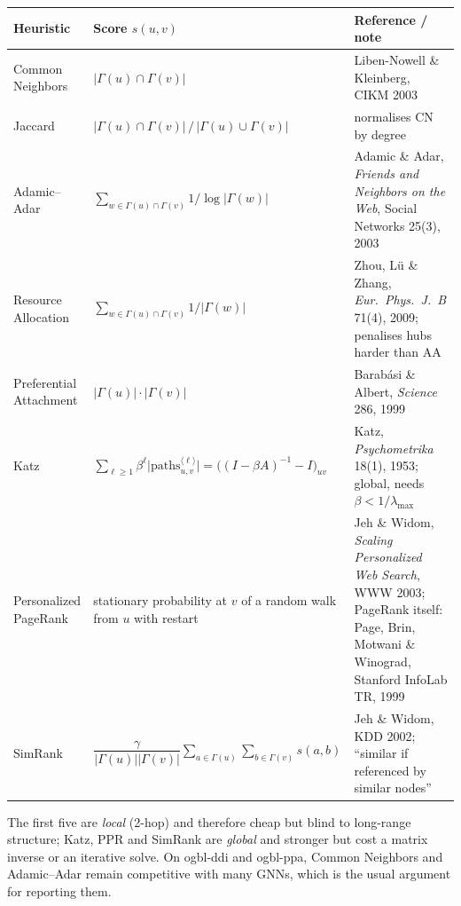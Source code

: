 \begin{center}
\footnotesize
\setlength{\tabcolsep}{4pt}
\renewcommand{\arraystretch}{1.35}
\begin{tabular}{@{}>{\raggedright\arraybackslash}p{2.35cm}
                  >{\raggedright\arraybackslash}p{5.5cm}
                  >{\raggedright\arraybackslash}p{6.3cm}@{}}
\toprule
Heuristic & Score $s(u,v)$ & Reference / note \\
\midrule
Common Neighbors & $|\Gamma(u)\cap\Gamma(v)|$ &
  Liben-Nowell \& Kleinberg, CIKM 2003 \\
Jaccard & $|\Gamma(u)\cap\Gamma(v)| \,/\, |\Gamma(u)\cup\Gamma(v)|$ &
  normalises CN by degree \\
Adamic--Adar & $\textstyle\sum_{w\in\Gamma(u)\cap\Gamma(v)} 1/\log|\Gamma(w)|$ &
  Adamic \& Adar, \emph{Friends and Neighbors on the Web}, Social Networks 25(3), 2003 \\
Resource Allocation & $\textstyle\sum_{w\in\Gamma(u)\cap\Gamma(v)} 1/|\Gamma(w)|$ &
  Zhou, L\"u \& Zhang, \emph{Eur.\ Phys.\ J.\ B} 71(4), 2009; penalises hubs harder than AA \\
Preferential Attachment & $|\Gamma(u)|\cdot|\Gamma(v)|$ &
  Barab\'asi \& Albert, \emph{Science} 286, 1999 \\
Katz & $\textstyle\sum_{\ell\geq1}\beta^{\ell}\bigl|\mathrm{paths}^{\langle\ell\rangle}_{u,v}\bigr|
        = \bigl((I-\beta A)^{-1}-I\bigr)_{uv}$ &
  Katz, \emph{Psychometrika} 18(1), 1953; global, needs $\beta<1/\lambda_{\max}$ \\
Personalized PageRank & stationary probability at $v$ of a random walk from $u$ with restart &
  Jeh \& Widom, \emph{Scaling Personalized Web Search}, WWW 2003; PageRank itself: Page, Brin, Motwani \& Winograd, Stanford InfoLab TR, 1999 \\
SimRank & $\dfrac{\gamma}{|\Gamma(u)||\Gamma(v)|}
           \textstyle\sum_{a\in\Gamma(u)}\sum_{b\in\Gamma(v)} s(a,b)$ &
  Jeh \& Widom, KDD 2002; ``similar if referenced by similar nodes'' \\
\bottomrule
\end{tabular}
\end{center}

\noindent
The first five are \emph{local} (2-hop) and therefore cheap but blind to long-range
structure; Katz, PPR and SimRank are \emph{global} and stronger but cost a matrix inverse or
an iterative solve. On ogbl-ddi and ogbl-ppa, Common Neighbors and Adamic--Adar remain
competitive with many GNNs, which is the usual argument for reporting them.

